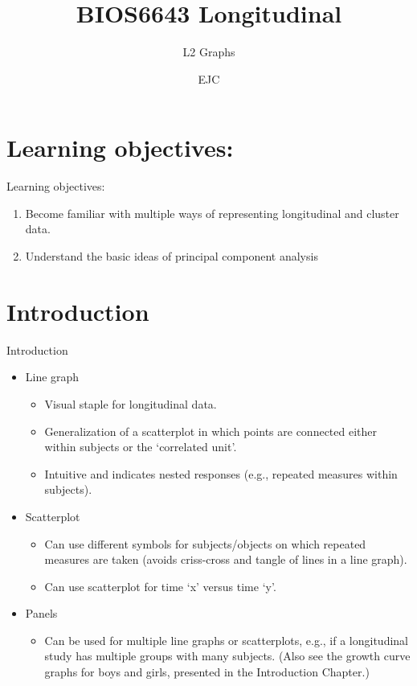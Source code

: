 \documentclass[
  9pt,
  ignorenonframetext,
]{beamer}
\title{BIOS6643 Longitudinal}
\subtitle{L2 Graphs}
\author{EJC}
\date{}
\institute{Department of Biostatistics \& Informatics}
\providecommand{\tightlist}{%
  \setlength{\itemsep}{0pt}\setlength{\parskip}{0pt}}
\begin{document}
\frame{\titlepage}

\begin{frame}[allowframebreaks]
  \tableofcontents[hideallsubsections]
\end{frame}
\hypertarget{learning-objectives}{%
\section{Learning objectives:}\label{learning-objectives}}

\begin{frame}{Learning objectives:}
\begin{enumerate}
\item
  Become familiar with multiple ways of representing longitudinal and
  cluster data.
\item
  Understand the basic ideas of principal component analysis
\end{enumerate}
\end{frame}

\hypertarget{introduction}{%
\section{Introduction}\label{introduction}}

\begin{frame}{Introduction}
\begin{itemize}
\item
  Line graph

  \begin{itemize}
  \item
    Visual staple for longitudinal data.
  \item
    Generalization of a scatterplot in which points are connected either
    within subjects or the `correlated unit'.
  \item
    Intuitive and indicates nested responses (e.g., repeated measures
    within subjects).
  \end{itemize}
\item
  Scatterplot

  \begin{itemize}
  \item
    Can use different symbols for subjects/objects on which repeated
    measures are taken (avoids criss-cross and tangle of lines in a line
    graph).
  \item
    Can use scatterplot for time `x' versus time `y'.
  \end{itemize}
\item
  Panels

  \begin{itemize}
  \tightlist
  \item
    Can be used for multiple line graphs or scatterplots, e.g., if a
    longitudinal study has multiple groups with many subjects. (Also see
    the growth curve graphs for boys and girls, presented in the
    Introduction Chapter.)
  \end{itemize}
\end{itemize}
\end{frame}
\end{document}
